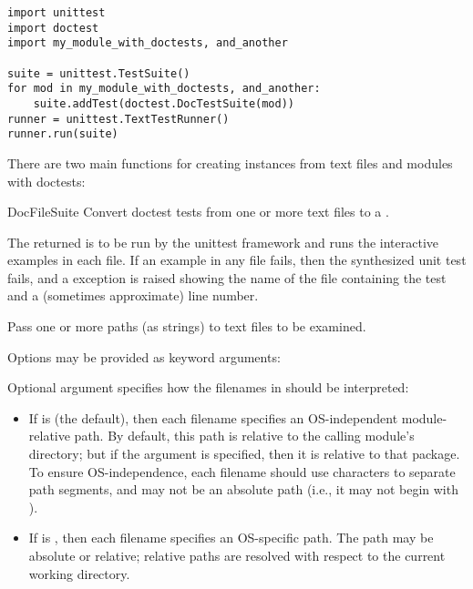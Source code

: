 \begin{verbatim}
import unittest
import doctest
import my_module_with_doctests, and_another

suite = unittest.TestSuite()
for mod in my_module_with_doctests, and_another:
    suite.addTest(doctest.DocTestSuite(mod))
runner = unittest.TextTestRunner()
runner.run(suite)
\end{verbatim}

There are two main functions for creating 
instances from text files and modules with doctests:

\begin{funcdesc}{DocFileSuite}{}
  Convert doctest tests from one or more text files to a
  .

  The returned  is to be run by the
  unittest framework and runs the interactive examples in each file.  If an
  example in any file fails, then the synthesized unit test fails, and a
   exception is raised showing the name of the
  file containing the test and a (sometimes approximate) line number.

  Pass one or more paths (as strings) to text files to be examined.

  Options may be provided as keyword arguments:

  Optional argument  specifies how
  the filenames in  should be interpreted:

  \begin{itemize}
  \item If  is  (the default), then
        each filename specifies an OS-independent module-relative
        path.  By default, this path is relative to the calling
        module's directory; but if the  argument is
        specified, then it is relative to that package.  To ensure
        OS-independence, each filename should use \code{/} characters
        to separate path segments, and may not be an absolute path
        (i.e., it may not begin with \code{/}).
  \item If  is , then each filename
        specifies an OS-specific path.  The path may be absolute or
        relative; relative paths are resolved with respect to the
        current working directory.
  \end{itemize}


\end{funcdesc}
